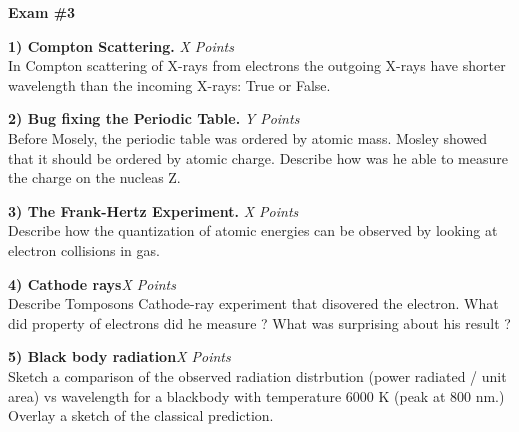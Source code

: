 



\thispagestyle{fancy}


\begin{center}
{\huge \textbf{Exam \#3}}
\large

\end{center}

{\large



\textbf{1) Compton Scattering. }\hfill \textit{X Points}\\
In Compton scattering of X-rays from electrons the outgoing X-rays have shorter wavelength than the incoming X-rays: True or False.

\vspace*{0.4in}

\textbf{2) Bug fixing the Periodic Table. }\hfill \textit{Y Points}\\
Before Mosely, the periodic table was ordered by atomic mass. Mosley showed that it should be ordered by atomic charge.  Describe how was he able to measure the charge on the nucleas Z.

\vfill

\textbf{3) The Frank-Hertz Experiment. }\hfill \textit{X Points}\\
Describe how the quantization of atomic energies can be observed by looking at electron collisions in gas.

\vfill

\clearpage

\textbf{4) Cathode rays}\hfill \textit{X Points}\\
Describe Tomposons Cathode-ray experiment that disovered the electron.
What did property of electrons did he measure ?
What was surprising about his result ?

\vspace*{2.4in}


\textbf{5) Black body radiation}\hfill \textit{X Points}\\
Sketch a comparison of the observed radiation distrbution (power radiated / unit area) vs wavelength for a blackbody with temperature 6000 K (peak at 800 nm.)
Overlay a sketch of the classical prediction.


\vspace*{3in}

}
